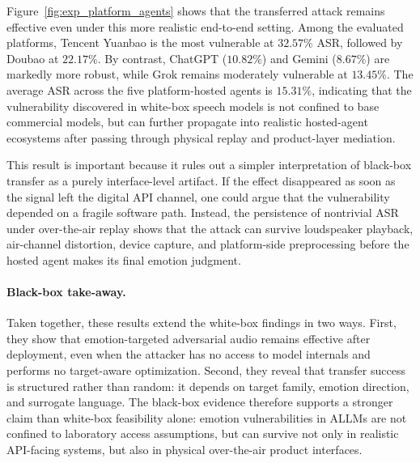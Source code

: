 Figure~\ref{fig:exp_platform_agents} shows that the transferred attack remains effective even under this more realistic end-to-end setting.
Among the evaluated platforms, Tencent Yuanbao is the most vulnerable at $\mathbf{32.57\%}$ ASR, followed by Doubao at $\mathbf{22.17\%}$.
By contrast, ChatGPT ($10.82\%$) and Gemini ($8.67\%$) are markedly more robust, while Grok remains moderately vulnerable at $13.45\%$.
The average ASR across the five platform-hosted agents is $15.31\%$, indicating that the vulnerability discovered in white-box speech models is not confined to base commercial models, but can further propagate into realistic hosted-agent ecosystems after passing through physical replay and product-layer mediation.

This result is important because it rules out a simpler interpretation of black-box transfer as a purely interface-level artifact.
If the effect disappeared as soon as the signal left the digital API channel, one could argue that the vulnerability depended on a fragile software path.
Instead, the persistence of nontrivial ASR under over-the-air replay shows that the attack can survive loudspeaker playback, air-channel distortion, device capture, and platform-side preprocessing before the hosted agent makes its final emotion judgment.

\paragraph{Black-box take-away.}
Taken together, these results extend the white-box findings in two ways.
First, they show that emotion-targeted adversarial audio remains effective after deployment, even when the attacker has no access to model internals and performs no target-aware optimization.
Second, they reveal that transfer success is structured rather than random: it depends on target family, emotion direction, and surrogate language.
The black-box evidence therefore supports a stronger claim than white-box feasibility alone: emotion vulnerabilities in ALLMs are not confined to laboratory access assumptions, but can survive not only in realistic API-facing systems, but also in physical over-the-air product interfaces.
